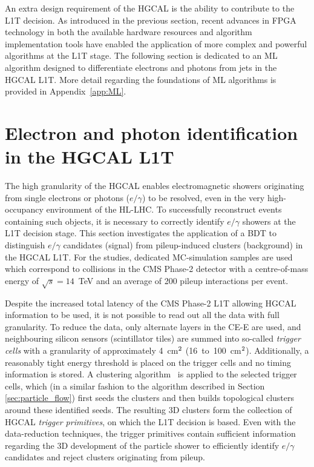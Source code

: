 An extra design requirement of the HGCAL is the ability to contribute to the L1T decision.
As introduced in the previous section, recent advances in FPGA technology in both the available hardware resources and algorithm implementation tools have enabled the application of more complex and powerful algorithms at the L1T stage. The following section is dedicated to an ML algorithm designed to differentiate electrons and photons from jets in the HGCAL L1T. More detail regarding the foundations of ML algorithms is provided in Appendix~\ref{app:ML}.

\section{Electron and photon identification in the HGCAL L1T}\label{sec:egid}
The high granularity of the HGCAL enables electromagnetic showers originating from single electrons or photons ($e/\gamma$) to be resolved, even in the very high-occupancy environment of the HL-LHC. To successfully reconstruct events containing such objects, it is necessary to correctly identify $e/\gamma$ showers at the L1T decision stage. This section investigates the application of a BDT to distinguish $e/\gamma$ candidates (signal) from pileup-induced clusters (background) in the HGCAL L1T. For the studies, dedicated MC-simulation samples are used which correspond to collisions in the CMS Phase-2 detector with a centre-of-mass energy of $\sqrt{s}=14$~TeV and an average of 200 pileup interactions per event.

Despite the increased total latency of the CMS Phase-2 L1T allowing HGCAL information to be used, it is not possible to read out all the data with full granularity. To reduce the data, only alternate layers in the CE-E are used, and neighbouring silicon sensors (scintillator tiles) are summed into so-called \textit{trigger cells} with a granularity of approximately 4~cm$^{\rm{2}}$ (16~to~100~cm$^{\rm{2}}$). Additionally, a reasonably tight energy threshold is placed on the trigger cells and no timing information is stored. A clustering algorithm~\cite{CERN-LHCC-2020-004} is applied to the selected trigger cells, which (in a similar fashion to the algorithm described in Section \ref{sec:particle_flow}) first seeds the clusters and then builds topological clusters around these identified seeds. The resulting 3D clusters form the collection of HGCAL \textit{trigger primitives}, on which the L1T decision is based. Even with the data-reduction techniques, the trigger primitives contain sufficient information regarding the 3D development of the particle shower to efficiently identify $e/\gamma$ candidates and reject clusters originating from pileup.


